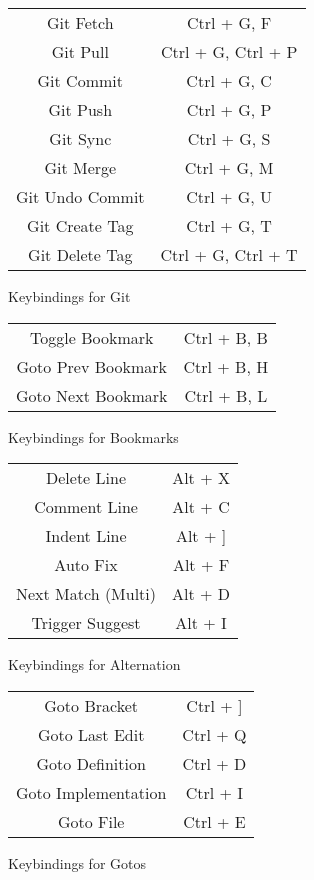 \documentclass[10pt]{article}
\begin{document}
	\begin{figure}[H]
		\centering
		\begin{tabular}{@{}c c@{}}
			\midrule

			Git Fetch & Ctrl + G, F \\
			Git Pull & Ctrl + G, Ctrl + P \\
			Git Commit & Ctrl + G, C \\
			Git Push & Ctrl + G, P \\
			Git Sync & Ctrl + G, S \\
			Git Merge & Ctrl + G, M \\
			Git Undo Commit & Ctrl + G, U \\
			Git Create Tag & Ctrl + G, T \\
			Git Delete Tag & Ctrl + G, Ctrl + T \\

			\bottomrule
		\end{tabular}
		\caption{Keybindings for Git}
	\end{figure}

	\begin{figure}[H]
		\centering
		\begin{tabular}{@{}c c@{}}
			\midrule

			Toggle Bookmark & Ctrl + B, B \\
			Goto Prev Bookmark & Ctrl + B, H \\
			Goto Next Bookmark & Ctrl + B, L \\

			\bottomrule
		\end{tabular}
		\caption{Keybindings for Bookmarks}
	\end{figure}


	\begin{figure}[H]
		\centering
		\begin{tabular}{@{}c c@{}}
			\midrule

			Delete Line & Alt + X \\
			Comment Line & Alt + C \\
			Indent Line & Alt + ] \\
			Auto Fix & Alt + F \\
			Next Match (Multi) & Alt + D \\
			Trigger Suggest & Alt + I \\

			\bottomrule
		\end{tabular}
		\caption{Keybindings for Alternation}
	\end{figure}

	\begin{figure}[H]
		\centering
		\begin{tabular}{@{}c c@{}}
			\midrule

			Goto Bracket & Ctrl + ] \\
			Goto Last Edit & Ctrl + Q \\
			Goto Definition & Ctrl + D \\
			Goto Implementation & Ctrl + I \\
			Goto File & Ctrl + E \\

			\bottomrule
		\end{tabular}
		\caption{Keybindings for Gotos}
	\end{figure}
\end{document}
